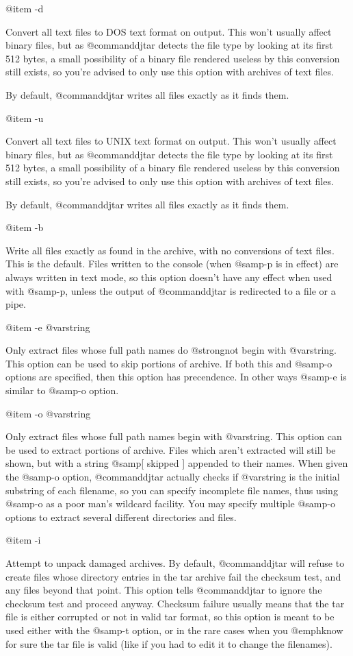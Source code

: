 @item -d

Convert all text files to DOS text format on output.  This won't usually
affect binary files, but as @command{djtar} detects the file type by looking
at its first 512 bytes, a small possibility of a binary file rendered
useless by this conversion still exists, so you're advised to only use
this option with archives of text files.

By default, @command{djtar} writes all files exactly as it finds them.

@item -u

Convert all text files to UNIX text format on output.  This won't usually
affect binary files, but as @command{djtar} detects the file type by looking
at its first 512 bytes, a small possibility of a binary file rendered
useless by this conversion still exists, so you're advised to only use
this option with archives of text files.

By default, @command{djtar} writes all files exactly as it finds them.

@item -b

Write all files exactly as found in the archive, with no conversions of
text files.  This is the default.
Files written to the console (when @samp{-p} is in effect) are always
written in text mode, so this option doesn't have any effect when used
with @samp{-p}, unless the output of @command{djtar} is redirected to a file
or a pipe.

@item -e @var{string}

Only extract files whose full path names do @strong{not} begin with @var{string}.
This option can be used to skip portions of archive.  If both this
and @samp{-o} options are specified, then this option has precendence.  In
other ways @samp{-e} is similar to @samp{-o} option.

@item -o @var{string}

Only extract files whose full path names begin with @var{string}.
This option can be used to extract portions of archive.  Files which aren't
extracted will still be shown, but with a string @samp{[ skipped ]}
appended to their names.  When given the @samp{-o} option, @command{djtar}
actually checks if @var{string} is the initial substring of each filename,
so you can specify incomplete file names, thus using @samp{-o} as a poor man's
wildcard facility.  You may specify multiple @samp{-o} options to extract
several different directories and files.

@item -i

Attempt to unpack damaged archives.
By default, @command{djtar} will refuse to create files whose directory
entries in the tar archive fail the checksum test, and any files beyond
that point.  This option tells @command{djtar} to ignore the checksum test
and proceed anyway.  Checksum failure usually means that the tar file is
either corrupted or not in valid tar format, so this option is meant to be
used either with the @samp{-t} option, or in the rare cases when you
@emph{know} for sure the tar file is valid (like if you had to edit it to
change the filenames).

